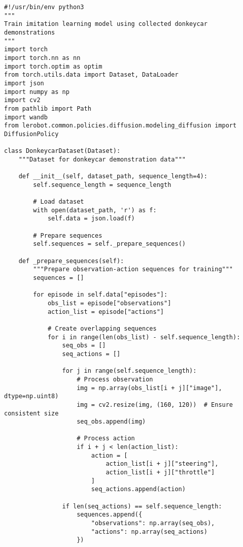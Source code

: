\documentclass[11pt,a4paper]{article}
\begin{document}
\begin{lstlisting}[style=pythonstyle, caption={Imitation learning with LeRobot (train\_imitation.py)}]
#!/usr/bin/env python3
"""
Train imitation learning model using collected donkeycar demonstrations
"""
import torch
import torch.nn as nn
import torch.optim as optim
from torch.utils.data import Dataset, DataLoader
import json
import numpy as np
import cv2
from pathlib import Path
import wandb
from lerobot.common.policies.diffusion.modeling_diffusion import DiffusionPolicy

class DonkeycarDataset(Dataset):
    """Dataset for donkeycar demonstration data"""
    
    def __init__(self, dataset_path, sequence_length=4):
        self.sequence_length = sequence_length
        
        # Load dataset
        with open(dataset_path, 'r') as f:
            self.data = json.load(f)
        
        # Prepare sequences
        self.sequences = self._prepare_sequences()
    
    def _prepare_sequences(self):
        """Prepare observation-action sequences for training"""
        sequences = []
        
        for episode in self.data["episodes"]:
            obs_list = episode["observations"]
            action_list = episode["actions"]
            
            # Create overlapping sequences
            for i in range(len(obs_list) - self.sequence_length):
                seq_obs = []
                seq_actions = []
                
                for j in range(self.sequence_length):
                    # Process observation
                    img = np.array(obs_list[i + j]["image"], dtype=np.uint8)
                    img = cv2.resize(img, (160, 120))  # Ensure consistent size
                    seq_obs.append(img)
                    
                    # Process action
                    if i + j < len(action_list):
                        action = [
                            action_list[i + j]["steering"],
                            action_list[i + j]["throttle"]
                        ]
                        seq_actions.append(action)
                
                if len(seq_actions) == self.sequence_length:
                    sequences.append({
                        "observations": np.array(seq_obs),
                        "actions": np.array(seq_actions)
                    })
        

\end{lstlisting}
\end{document}
